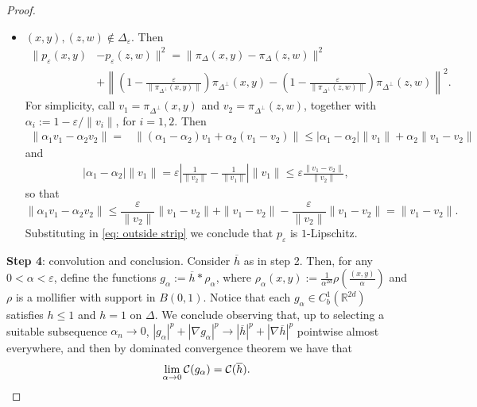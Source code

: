 \documentclass[10pt,a4paper]{amsart}
\newcommand{\R}{\mathbb{R}}
\begin{document}
\begin{proof}
\begin{itemize}
        \item $(x,y),(z,w) \notin \Delta_\varepsilon$. Then 
        \begin{equation}\label{eq: outside strip}
        \begin{aligned}
            \|p_\varepsilon(x,y) & - p_\varepsilon(z,w)\|^2 
            = 
            \|\pi_{\Delta}(x,y) - \pi_{\Delta}(z,w)\|^2
            \\
            & + \left\|\left(1 - \frac{\varepsilon}{\|\pi_{\Delta^\perp}(x,y) \|}\right)\pi_{\Delta^\perp}(x,y) - \left(1 - \frac{\varepsilon}{\|\pi_{\Delta^\perp}(z,w) \|}\right)\pi_{\Delta^\perp}(z,w)\right\|^2.
        \end{aligned}
        \end{equation}
        For simplicity, call $v_1 =\pi_{\Delta^\perp}(x,y)$ and $v_2 =\pi_{\Delta^\perp}(z,w)$, together with $\alpha_i := 1- \varepsilon/\|v_i\|$, for $i=1,2$. Then
        \begin{align*}
            \|\alpha_1 v_1 - \alpha_2 v_2\| = & 
            \|(\alpha_1-\alpha_2)v_1 + \alpha_2 (v_1 - v_2)\|
            \leq 
            |\alpha_1 - \alpha_2|\|v_1\| + \alpha_2 \|v_1 - v_2\|
        \end{align*}
        and 
        \begin{align*}
            |\alpha_1 - \alpha_2|\|v_1\| = \varepsilon\left|\frac{1}{\|v_2\|} - \frac{1}{\|v_1\|}\right|\|v_1\|\leq\varepsilon \frac{\|v_1-v_2\|}{\|v_2\|},
        \end{align*}
        so that 
        \[\|\alpha_1 v_1 - \alpha_2 v_2\| \leq \frac{\varepsilon}{\|v_2\|}\|v_1 - v_2\| + \|v_1-v_2\| - \frac{\varepsilon}{\|v_2\|}\|v_1-v_2\| = \|v_1-v_2\|.\]
        Substituting in \eqref{eq: outside strip} we conclude that $p_\varepsilon$ is $1$-Lipschitz.
    \end{itemize}

    \textbf{Step 4}: convolution and conclusion. Consider $\overline{h}$ as in step 2. Then, for any $0 <\alpha < \varepsilon$, define the functions $g_\alpha:= \overline{h} * \rho_\alpha$, where $\rho_\alpha(x,y) := \frac{1}{\alpha^{2d}}\rho\left(\frac{(x,y)}{\alpha}\right)$ and $\rho$ is a mollifier with support in $B(0,1)$. Notice that each $g_\alpha\in C_b^1(\R^{2d})$ satisfies $h\leq 1$ and $h = 1$ on $\Delta$. We conclude observing that, up to selecting a suitable subsequence $\alpha_n \to 0$, $|g_\alpha|^p + |\nabla g_\alpha|^p \to |\overline{h}|^p + |\nabla \overline{h}|^p$ pointwise almost everywhere, and then by dominated convergence theorem we have that 
    \[\lim_{\alpha \to 0}\mathcal{C}(g_\alpha) = \mathcal{C}(\overline{h}). \qedhere \]
\end{proof}
\end{document}
